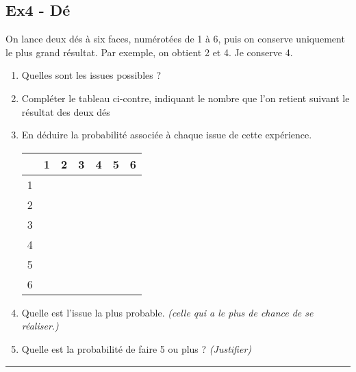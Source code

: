 \documentclass[11pt]{article}
\newcommand{\horrule}[1]{\rule{\linewidth}{#1}} %
\begin{document}
\begin{multicols}{2}
  \subsection*{Ex4 - Dé}

  On lance deux dés à six faces, numérotées de 1 à 6, puis on conserve uniquement le plus grand résultat. Par exemple, on obtient 2 et 4. Je conserve 4.

  \begin{enumerate}
  \item Quelles sont les issues possibles ?
  \item Compléter le tableau ci-contre, indiquant le nombre que l’on retient suivant le résultat des deux dés
  \item En déduire la probabilité associée à chaque issue de cette expérience. 
    \begin{center}
      \begin{tabular}{|c|c|c|c|c|c|c|}
        \hline
        & 1 & 2 & 3 & 4 & 5 & 6 \\
        \hline
        1 &   &   &   &   &   &\\  
        \hline
        2 &   &   &   &   &   &\\  
        \hline
        3 &   &   &   &   &   &\\  
        \hline
        4 &   &   &   &   &   &\\  
        \hline
        5 &   &   &   &   &   &\\  
        \hline
        6 &   &   &   &   &   &\\
        \hline     
      \end{tabular}
    \end{center}
  \item Quelle est l'issue la plus probable. \textit{(celle qui a le plus de chance de se réaliser.)}
  \item Quelle est la probabilité de faire 5 ou plus ?  \textit{(Justifier)}
  \end{enumerate}
\end{multicols}

\vspace{-0.4cm}
\horrule{1px}
\vspace{-0.8cm}
\end{document}
